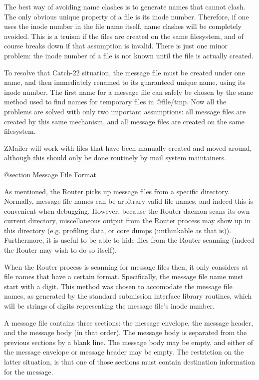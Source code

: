 The best way of avoiding name clashes is to generate names that
cannot clash.
The only obvious unique property of a file is its inode number.
Therefore, if one uses the inode number in the file name itself,
name clashes will be completely avoided.
This is a truism if the files are created on the same filesystem,
and of course breaks down if that assumption is invalid.
There is just one minor problem: the inode number of a file is
not known until the file is actually created.

To resolve that Catch-22 situation, the message file must be
created under one name, and then immediately renamed to its
guaranteed unique name, using its inode number.
The first name for a message file can safely be chosen by
the same method used to find names for temporary files in @file{/tmp}.
Now all the problems are solved with only two important assumptions:
all message files are created by this same mechanism, and all message
files are created on the same filesystem.

ZMailer will work with files that have been manually created and moved
around, although this should only be done routinely by mail system
maintainers.

@section Message File Format

As mentioned, the Router picks up message files from a specific directory.
Normally, message file names can be arbitrary valid file names, and indeed
this is convenient when debugging.
However, because the Router daemon scans its own current directory,
miscellaneous output from the Router process may show up in this
directory (e.g. profiling data, or core dumps (unthinkable as that is)).
Furthermore, it is useful to be able to hide files from the Router
scanning (indeed the Router may wish to do so itself).

When the Router process is scanning for message files then, it
only considers at file names that have a certain format.
Specifically, the message file name must start with a digit.
This method was chosen to accomodate the message file names, as generated
by the standard submission interface library routines, which will be strings
of digits representing the message file's inode number.

A message file contains three sections: the message envelope, the message
header, and the message body (in that order).
The message body is separated from the previous sections by a blank line.
The message body may be empty, and either of the message envelope or message
header may be empty.
The restriction on the latter situation, is that one of those sections
must contain destination information for the message.

